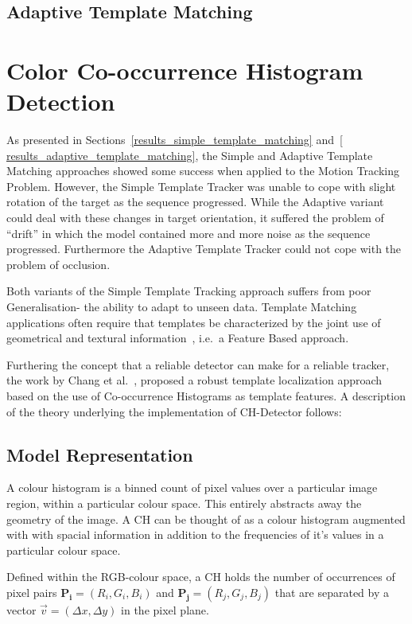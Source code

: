 \subsection{Adaptive Template Matching}\label{theoretical_framework_adaptive_tm}


\section{Color Co-occurrence Histogram Detection}\label{theoretical_framework_ch}
As presented in Sections~\ref{results_simple_template_matching} and~\ref{
results_adaptive_template_matching}, the Simple and Adaptive Template Matching
approaches showed some success when applied to the Motion
Tracking Problem. However, the Simple Template Tracker was unable to cope with
slight rotation of the target as the sequence progressed.
While the Adaptive variant could deal with these changes in target
orientation, it suffered the problem of ``drift'' in which the model contained
more and more noise as the sequence progressed.
Furthermore the Adaptive Template Tracker could not cope with the problem of
occlusion.

Both variants of the Simple Template Tracking approach suffers from poor Generalisation- the
ability to adapt to unseen data. Template Matching applications often require
that templates be characterized by the joint use of geometrical and textural
information~\cite{Brunelli}, i.e.\ a Feature Based approach.

Furthering the concept that a reliable detector can make for a reliable tracker,
the work by Chang et al.~\cite{Chang1999}, proposed a robust template
localization approach based on the use of Co-occurrence Histograms as template
features. A description of the theory underlying the implementation of CH-Detector 
follows:

\subsection{Model Representation}
A colour histogram is a binned count of pixel values over a particular image
region, within a particular colour space. This entirely abstracts away the geometry of
the image.
A CH can be thought of as a colour histogram augmented with with spacial
information in addition to the frequencies of it's values in a particular colour
space.

Defined within the RGB-colour space, a CH holds the number of occurrences of
pixel pairs $\mathbf{P_i}=(R_i,G_i,B_i)$ and $\mathbf{P_j}=(R_j,G_j,B_j)$ that
are separated by a vector $\vec{v}=(\Delta{x}, \Delta{y})$ in the pixel plane.

